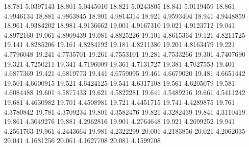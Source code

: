 18.781 5.0397143
18.801 5.0445010
18.821 5.0243805
18.841 5.0119459
18.861 4.9946134
18.881 4.9863845
18.901 4.9814314
18.921 4.9593404
18.941 4.9448859
18.961 4.9384202
18.981 4.9136662
19.001 4.9167310
19.021 4.9123712
19.041 4.8972160
19.061 4.8909439
19.081 4.8825226
19.101 4.8615364
19.121 4.8211725
19.141 4.8285206
19.161 4.8284192
19.181 4.8211380
19.201 4.8163479
19.221 4.7796048
19.241 4.7735701
19.261 4.7553101
19.281 4.7533266
19.301 4.7407690
19.321 4.7250211
19.341 4.7196009
19.361 4.7131727
19.381 4.7027553
19.401 4.6877369
19.421 4.6819773
19.441 4.6759095
19.461 4.6679020
19.481 4.6651442
19.501 4.6600915
19.521 4.6424125
19.541 4.6317108
19.561 4.6205079
19.581 4.6084488
19.601 4.5877433
19.621 4.5822281
19.641 4.5489216
19.661 4.5411242
19.681 4.4630982
19.701 4.4508981
19.721 4.4451715
19.741 4.4289875
19.761 4.3780842
19.781 4.3709234
19.801 4.3582476
19.821 4.3282439
19.841 4.3110419
19.861 4.3049276
19.881 4.2962816
19.901 4.2764648
19.921 4.2699252
19.941 4.2561763
19.961 4.2443664
19.981 4.2322299
20.001 4.2183856
20.021 4.2062035
20.041 4.1681256
20.061 4.1627708
20.081 4.1599708
